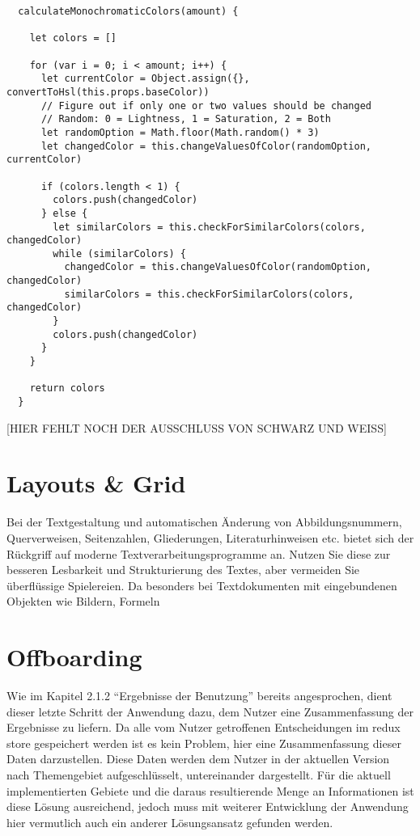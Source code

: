 \begin{lstlisting}
  calculateMonochromaticColors(amount) {

    let colors = []

    for (var i = 0; i < amount; i++) {
      let currentColor = Object.assign({}, convertToHsl(this.props.baseColor))
      // Figure out if only one or two values should be changed
      // Random: 0 = Lightness, 1 = Saturation, 2 = Both
      let randomOption = Math.floor(Math.random() * 3)
      let changedColor = this.changeValuesOfColor(randomOption, currentColor)

      if (colors.length < 1) {
        colors.push(changedColor)
      } else {
        let similarColors = this.checkForSimilarColors(colors, changedColor)
        while (similarColors) {
          changedColor = this.changeValuesOfColor(randomOption, changedColor)
          similarColors = this.checkForSimilarColors(colors, changedColor)
        }
        colors.push(changedColor)
      }
    }

    return colors
  }
\end{lstlisting}

[HIER FEHLT NOCH DER AUSSCHLUSS VON SCHWARZ UND WEISS]


\section{Layouts \& Grid}
Bei der Textgestaltung und automatischen Änderung von Abbildungsnummern, Querverweisen,
Seitenzahlen, Gliederungen, Literaturhinweisen etc. bietet sich der Rückgriff
auf moderne Textverarbeitungsprogramme an. Nutzen Sie diese zur besseren Lesbarkeit
und Strukturierung des Textes, aber vermeiden Sie überflüssige Spielereien. Da
besonders bei Textdokumenten mit eingebundenen Objekten wie Bildern, Formeln

\section{Offboarding}
Wie im Kapitel 2.1.2 “Ergebnisse der Benutzung”  bereits angesprochen, dient dieser letzte Schritt der Anwendung dazu, dem Nutzer eine Zusammenfassung der Ergebnisse zu liefern.
Da alle vom Nutzer getroffenen Entscheidungen im redux store gespeichert werden ist es kein Problem, hier eine Zusammenfassung dieser Daten darzustellen.
Diese Daten werden dem Nutzer in der aktuellen Version nach Themengebiet aufgeschlüsselt, untereinander dargestellt. Für die aktuell implementierten Gebiete und die daraus resultierende Menge an Informationen ist diese Lösung ausreichend, jedoch muss mit weiterer Entwicklung der Anwendung hier vermutlich auch ein anderer Lösungsansatz gefunden werden.

